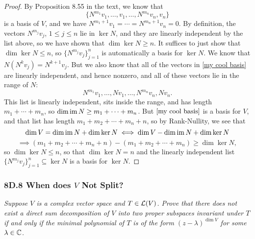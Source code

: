 \documentclass{article}
\begin{document}
\begin{proof}
By Proposition 8.55 in the text, we know that
\begin{equation}\label{my cool basis}
\{N^{m_1}v_1, \ldots, v_1, \ldots, N^{m_n}v_n, v_n\}
\end{equation}
is a basis of $V$, and we have $N^{m_1+1}v_1 = \cdots = N^{m_n+1}v_n = 0$. By definition, the vectors $N^{m_j}v_j$, $1\leq j \leq n$ lie in $\ker N$, and they are linearly independent by the list above, so we have shown that $\dim \ker N \geq n$.  It suffices to just show that $\dim \ker N \leq n$, so $\{N^{m_j}v_j\}_{j=1}^n$ is automatically a basis for $\ker N$. We know that $N(N^kv_j) = N^{k+1}v_j$. But we also know that all of the vectors in \eqref{my cool basis} are linearly independent, and hence nonzero, and all of these vectors lie in the range of $N$:
$$N^{m_1}v_1, \ldots, Nv_1, \ldots, N^{m_n}v_n, Nv_n.$$
This list is linearly independent, sits inside the range, and has length $m_1 + \cdots + m_n$, so $\dim\operatorname{im} N \geq m_1 + \cdots + m_n$. But $\eqref{my cool basis}$ is a basis for $V$, and that list has length $m_1 + m_2 + \cdots + m_n + n$, so by Rank-Nullity, we see that
$$\dim V = \dim\operatorname{im} N + \dim\ker N \iff \dim V - \dim\operatorname{im} N + \dim\ker N$$
$$\implies (m_1 + m_2 + \cdots + m_n + n) - (m_1 + m_2 + \cdots + m_n) \geq \dim \ker N,$$
so $\dim\ker N \leq n$, so that $\dim\ker N = n$ and the linearly independent list $\{N^{m_j}v_j\}_{j=1}^n\subseteq \ker N$ is a basis for $\ker N$.
\end{proof}
\newpage
\subsubsection*{8D.8 When does $V$ Not Split?}
\textit{Suppose $V$ is a complex vector space and $T\in\mathcal L(V)$. Prove that there does not exist a direct sum decomposition of $V$ into two proper subspaces invariant under $T$ if and only if the minimal polynomial of $T$ is of the form $(z-\lambda )^{\dim V}$ for some $\lambda\in\mathbb C$.}
\end{document}
